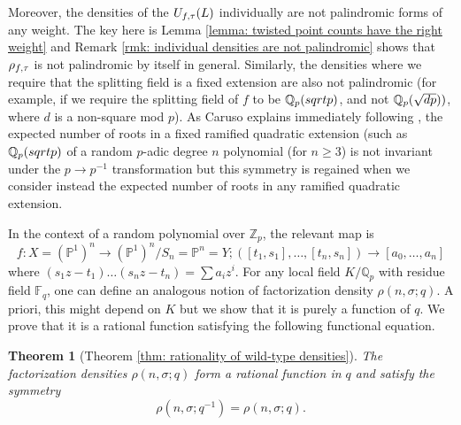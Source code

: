 \documentclass[10pt]{article}
\theoremstyle{plain}
\newtheorem{thm}[theorem]{Theorem}
\theoremstyle{definition}
\numberwithin{equation}{section}
\begin{document}
Moreover, the densities of the $U_{f,\tau}({L})$ individually are not palindromic forms of any weight. The key here is Lemma \ref{lemma: twisted point counts have the right weight} and Remark \ref{rmk: individual densities are not palindromic} shows that $\rho_{f,\tau}$ is not palindromic by itself in general. Similarly, the densities where we require that the splitting field is a fixed extension are also not palindromic (for example, if we require the splitting field of $f$ to be ${\mathbb Q}_p(sqrt p)$, and not ${\mathbb Q}_p(\sqrt{dp}))$, where $d$ is a non-square mod $p$). As Caruso explains immediately following \cite[Theorem C]{caruso2022zeroes}, the expected number of roots in a fixed ramified quadratic extension (such as ${\mathbb Q}_p(sqrt p)$ of a random $p$-adic degree $n$ polynomial (for $n \geq 3$) is not invariant under the $p \to p^{-1}$ transformation but this symmetry is regained when we consider instead the expected number of roots in any ramified quadratic extension. 

In the context of a random polynomial over $\mathbb Z_p$, the relevant map is
\[f: X = (\mathbb P^1)^n \to (\mathbb P^1)^n/S_n = \mathbb P^n = Y; ([t_1,s_1],\dots,[t_n,s_n]) \to [a_0, \dots, a_n]\]
where $(s_1z-t_1)\dots(s_nz-t_n) = \sum a_i z^i$. For any local field $K/\mathbb Q_p$ with residue field $\mathbb F_q$, one can define an analogous notion of factorization density $\rho(n,\sigma;q)$. A priori, this might depend on $K$ but we show that it is purely a function of $q$. We prove that it is a rational function satisfying the following functional equation.

\begin{thm}[Theorem \ref{thm: rationality of wild-type densities}]
The factorization densities $\rho(n,\sigma;q)$ form a rational function in $q$ and satisfy the symmetry
\[\rho(n,\sigma;q^{-1}) = \rho(n,\sigma;q).\]
\end{thm}
\end{document}
